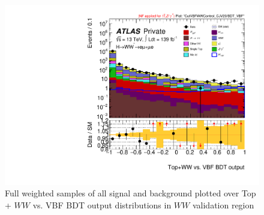 \begin{figure}[!htbp]
\centering
\includegraphics[width=.6\linewidth]{Pictures/run2-emme-CutVBFWWControl_CJV20-BDT_VBF-log.pdf}
\caption{Full weighted samples of all signal and background plotted over Top + $WW$ vs. VBF BDT output distributions in $WW$ validation region}
\label{fig:VBFvWWTopBDTVR}
\end{figure}

